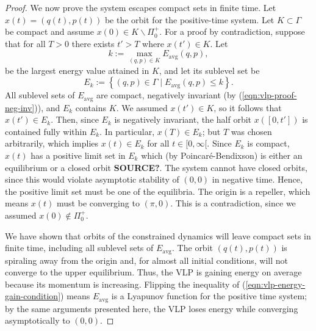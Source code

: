 \begin{proof}
   We now prove the system escapes compact sets in finite time.
   Let \(x(t) = (q(t),p(t))\) be the orbit for the positive-time system.
   Let \(K \subset \Gamma\) be compact and assume \(x(0) \in K\backslash \Pi_0^+\).
   For a proof by contradiction, suppose that for all \(T > 0\) there exists
   \(t' > T\) where \(x(t') \in K\).
   Let 
   \[
      k := \max\limits_{(q,p) \in K} E_\text{avg}(q,p)
      ,
   \] 
   be the largest energy value attained in \(K\), and let its sublevel set be
   \[
      E_k := \left\{ (q,p) \in \Gamma \mid E_\text{avg}(q,p) \leq k \right\}
      .
   \]
   All sublevel sets of \(E_\text{avg}\) are compact, negatively
   invariant (by (\ref{eqn:vlp-proof-neg-inv})), and \(E_k\) contains \(K\).
   We assumed \(x(t') \in K\), so it follows that \(x(t') \in E_k\). 
   Then, since \(E_k\) is negatively invariant, the half orbit
   \(x([0,t'])\) is contained fully within \(E_k\).
   In particular, \(x(T) \in E_k\);
   but \(T\) was chosen arbitrarily, which implies \(x(t) \in E_k\) for all
   \(t \in [0,\infty[\).
   Since \(E_k\) is compact, \(x(t)\) has a positive limit set in
   \(E_k\) which (by Poincar\'{e}-Bendixson) is either an equilibrium or a
   closed orbit \textbf{SOURCE?}.
   The system cannot have closed orbits, since this would violate asymptotic
   stability of \((0,0)\) in negative time. 
   Hence, the positive limit set must be one of the equilibria. 
   The origin is a repeller, which means \(x(t)\) must be converging to 
   \((\pi,0)\).
   This is a contradiction, since we assumed \(x(0) \not \in \Pi_0^+\).

   We have shown that orbits of the constrained dynamics will leave compact sets in
   finite time, including all sublevel sets of \(E_\text{avg}\). 
   The orbit \((q(t),p(t))\) is spiraling away from the origin and, for almost
   all initial conditions, will not converge to the upper equilibrium.
   Thus, the VLP is gaining energy on average because its momentum is increasing.
   Flipping the inequality of (\ref{eqn:vlp-energy-gain-condition}) 
   means \(E_\text{avg}\) is a Lyapunov function for the positive time system;
   by the same arguments presented here, the VLP loses energy while
   converging asymptotically to \((0,0)\).
 \end{proof}

